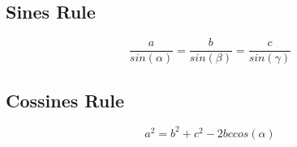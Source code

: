\subsection{Sines Rule}
$$ \dfrac{a}{sin(\alpha)} = \dfrac{b}{sin(\beta)} = \dfrac{c}{sin(\gamma)} $$

\subsection{Cossines Rule}
$$ a^2 = b^2 + c^2 - 2bccos(\alpha) $$